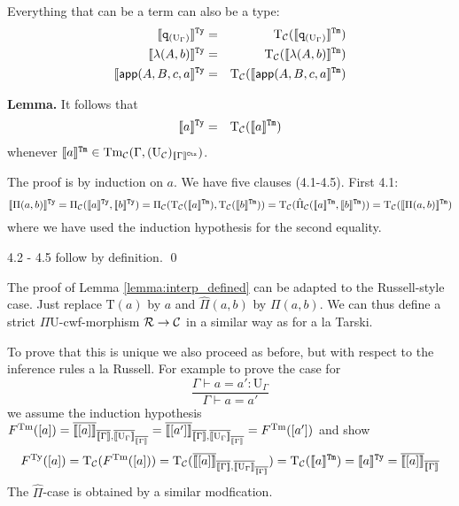 \documentclass{lmcs}
\def\UU{\mathrm{U}}
\def\Ta{\mathrm{T}}
\def\Pihat{\hat{\Pi}}
\newcommand{\intCtxU}[1]{\llbracket #1 \rrbracket^\RawCtx}
\newcommand{\intTyU}[1]{\llbracket #1 \rrbracket^\RawTy}
\newcommand{\intTmU}[1]{\llbracket #1 \rrbracket^\RawTm}
\begin{document}
Everything that can be a term can also be a type: 
\begin{eqnarray}
\intTyU{\qI_{(\UU_\Gamma)}}&=& \Ta_\C(\intTmU{\qI_{(\UU_\Gamma)}})\\
\intTyU{\lambda(A,b)}&=& \Ta_\C(\intTmU{\lambda(A,b)})\\
\intTyU{\app(A,B,c,a}&=& \Ta_\C(\intTmU{\app(A,B,c,a})
\end{eqnarray}

{\bf Lemma.}
It follows that
\begin{eqnarray*}
\intTyU{a} &=& \Ta_\C(\intTmU{a})
\end{eqnarray*}
whenever $\intTmU{a} \in  \Tm_\C(\Gamma,(\UU_\C)_{\intCtxU{\Gamma}})$. 

The proof is by induction on $a$. We have five clauses (4.1-4.5). First 4.1:
$$
\intTyU{\Pi(a,b)} = \Pi_\C(\intTyU{a},\intTyU{b}) = \Pi_\C(\Ta_\C(\intTmU{a}),\Ta_\C(\intTmU{b})) = \Ta_\C(\Pihat_\C(\intTmU{a},\intTmU{b})) = \Ta_\C(\intTmU{\Pi(a,b)})
$$ 
where we have used the induction hypothesis for the second equality.

4.2 - 4.5 follow by definition.
\qed

The proof of Lemma \ref{lemma:interp_defined} can be adapted to the Russell-style case. Just replace $\Ta(a)$ by $a$ and $\Pihat(a,b)$ by $\Pi(a,b)$. 
We can thus define a strict $\Pi\UU$-cwf-morphism $\mathcal{R} \to {\mathcal C}$ in a similar way as for a la Tarski. 

To prove that this is unique we also proceed as before, but with respect to the inference rules a la Russell. For example to prove the case for
$$
\frac{\Gamma \vdash a = a' : \UU_\Gamma}
{\Gamma \vdash a = a' }
$$
we assume the induction hypothesis 
 $F^\Tm([a]) = \iniTm{\iniCtx{\Gamma}}{\iniTy{\iniCtx{\Gamma}}{\UU_\Gamma}}{[a]} 
 = \iniTm{\iniCtx{\Gamma}}{\iniTy{\iniCtx{\Gamma}}{\UU_\Gamma}}{[a']} = F^\Tm([a'])$
and show
$$
F^\Ty([a]) = \Ta_\C(F^\Tm([a])) = \Ta_\C(\iniTm{\iniCtx{\Gamma}}{\iniTy{\iniCtx{\Gamma}}{\UU_\Gamma}}{[a]}) = \Ta_\C(\intTmU{a}) = \intTyU{a} = \iniTy{\iniCtx{\Gamma}}{[a]}
$$
%
%
%
%
The $\Pihat$-case is obtained by a similar modfication. 
\end{document}
